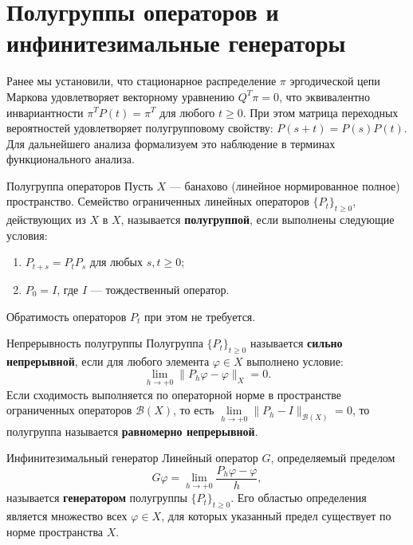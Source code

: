 \section{Полугруппы операторов и инфинитезимальные генераторы}

Ранее мы установили, что стационарное распределение $\pi$ эргодической цепи Маркова удовлетворяет векторному уравнению $Q^T \pi = 0$, что эквивалентно инвариантности $\pi^T P(t) = \pi^T$ для любого $t \ge 0$. При этом матрица переходных вероятностей удовлетворяет полугрупповому свойству: $P(s+t) = P(s) P(t)$. Для дальнейшего анализа формализуем это наблюдение в терминах функционального анализа.

\begin{definition}{Полугруппа операторов}
    Пусть $X$ — банахово (линейное нормированное полное) пространство. Семейство ограниченных линейных операторов $\{P_t\}_{t \ge 0}$, действующих из $X$ в $X$, называется \textbf{полугруппой}, если выполнены следующие условия:
    \begin{enumerate}
        \item $P_{t+s} = P_t P_s$ для любых $s, t \ge 0$;
        \item $P_0 = I$, где $I$ — тождественный оператор.
    \end{enumerate}
    Обратимость операторов $P_t$ при этом не требуется.
\end{definition}

\begin{definition}{Непрерывность полугруппы}
    Полугруппа $\{P_t\}_{t \ge 0}$ называется \textbf{сильно непрерывной}, если для любого элемента $\varphi \in X$ выполнено условие:
    \[
        \lim_{h \to +0} \|P_h \varphi - \varphi\|_X = 0.
    \]
    Если сходимость выполняется по операторной норме в пространстве ограниченных операторов $\mathcal{B}(X)$, то есть $\lim\limits_{h \to +0} \|P_h - I\|_{\mathcal{B}(X)} = 0$, то полугруппа называется \textbf{равномерно непрерывной}.
\end{definition}

\begin{definition}{Инфинитезимальный генератор}
    Линейный оператор $G$, определяемый пределом
    \[
        G \varphi = \lim_{h \to +0} \frac{P_h \varphi - \varphi}{h},
    \]
    называется \textbf{генератором} полугруппы $\{P_t\}_{t \ge 0}$. Его областью определения является множество всех $\varphi \in X$, для которых указанный предел существует по норме пространства $X$.
\end{definition}


